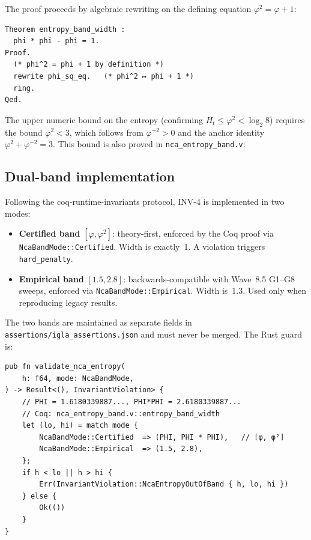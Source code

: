 
\noindent
The proof proceeds by algebraic rewriting on the defining equation
\(\varphi^2 = \varphi + 1\):
\begin{verbatim}
Theorem entropy_band_width :
  phi * phi - phi = 1.
Proof.
  (* phi^2 = phi + 1 by definition *)
  rewrite phi_sq_eq.   (* phi^2 ↦ phi + 1 *)
  ring.
Qed.
\end{verbatim}

The upper numeric bound on the entropy (confirming \(H_t \leq \varphi^2
< \log_2 8\)) requires the bound
\(\varphi^2 < 3\), which follows from \(\varphi^{-2} > 0\) and
the anchor identity \(\varphi^2 + \varphi^{-2} = 3\).  This bound is
also proved in \texttt{nca\_entropy\_band.v}:



\subsection{Dual-band implementation}
\label{subsec:strand3-dualband}

Following the coq-runtime-invariants protocol, INV-4 is implemented
in two modes:
\begin{itemize}
  \item \textbf{Certified band} \([\varphi, \varphi^2]\): theory-first,
    enforced by the Coq proof via \texttt{NcaBandMode::Certified}.
    Width is exactly~1.  A violation triggers \texttt{hard\_penalty}.
  \item \textbf{Empirical band} \([1.5, 2.8]\): backwards-compatible
    with Wave~8.5 G1–G8 sweeps, enforced via
    \texttt{NcaBandMode::Empirical}.  Width is~1.3.  Used only when
    reproducing legacy results.
\end{itemize}

The two bands are maintained as separate fields in
\texttt{assertions/igla\_assertions.json} and must never be merged.
The Rust guard is:
\begin{verbatim}
pub fn validate_nca_entropy(
    h: f64, mode: NcaBandMode,
) -> Result<(), InvariantViolation> {
    // PHI = 1.6180339887..., PHI*PHI = 2.6180339887...
    // Coq: nca_entropy_band.v::entropy_band_width
    let (lo, hi) = match mode {
        NcaBandMode::Certified  => (PHI, PHI * PHI),   // [φ, φ²]
        NcaBandMode::Empirical  => (1.5, 2.8),
    };
    if h < lo || h > hi {
        Err(InvariantViolation::NcaEntropyOutOfBand { h, lo, hi })
    } else {
        Ok(())
    }
}
\end{verbatim}

